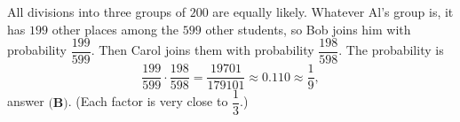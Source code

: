 All divisions into three groups of $200$ are equally likely. Whatever Al's group is, it has $199$ other places among the $599$ other students, so Bob joins him with probability $\dfrac{199}{599}$. Then Carol joins them with probability $\dfrac{198}{598}$. The probability is
\[\dfrac{199}{599}\cdot\dfrac{198}{598}=\dfrac{19701}{179101}\approx0.110\approx\dfrac19,\]
answer $\boxed{\textbf{(B)}}$. (Each factor is very close to $\dfrac13$.)
